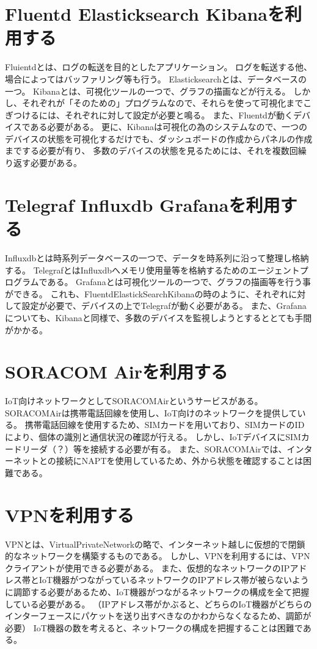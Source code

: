 \section{Fluentd Elasticksearch Kibanaを利用する}
Fluientdとは、ログの転送を目的としたアプリケーション。
ログを転送する他、場合によってはバッファリング等も行う。
Elasticksearchとは、データベースの一つ。
Kibanaとは、可視化ツールの一つで、グラフの描画などが行える。
しかし、それぞれが「そのための」プログラムなので、それらを使って可視化までこぎつけるには、それぞれに対して設定が必要と鳴る。
また、Fluentdが動くデバイスである必要がある。
更に、Kibanaは可視化の為のシステムなので、一つのデバイスの状態を可視化するだけでも、ダッシュボードの作成からパネルの作成までする必要が有り、
多数のデバイスの状態を見るためには、それを複数回繰り返す必要がある。

\section{Telegraf Influxdb Grafanaを利用する}
Influxdbとは時系列データベースの一つで、データを時系列に沿って整理し格納する。
TelegrafとはInfluxdbへメモリ使用量等を格納するためのエージェントプログラムである。
Grafanaとは可視化ツールの一つで、グラフの描画等を行う事ができる。
これも、FluentdElastickSearchKibanaの時のように、それぞれに対して設定が必要で、デバイスの上でTelegrafが動く必要がある。
また、Grafanaについても、Kibanaと同様で、多数のデバイスを監視しようとするととても手間がかかる。

\section{SORACOM Airを利用する}
IoT向けネットワークとしてSORACOMAirというサービスがある。
SORACOMAirは携帯電話回線を使用し、IoT向けのネットワークを提供している。
携帯電話回線を使用するため、SIMカードを用いており、SIMカードのIDにより、個体の識別と通信状況の確認が行える。
しかし、IoTデバイスにSIMカードリーダ（？）等を接続する必要が有る。
また、SORACOMAirでは、インターネットとの接続にNAPTを使用しているため、外から状態を確認することは困難である。

\section{VPNを利用する}
VPNとは、VirtualPrivateNetworkの略で、インターネット越しに仮想的で閉鎖的なネットワークを構築するものである。
しかし、VPNを利用するには、VPNクライアントが使用できる必要がある。
また、仮想的なネットワークのIPアドレス帯とIoT機器がつながっているネットワークのIPアドレス帯が被らないように調節する必要があるため、IoT機器がつながるネットワークの構成を全て把握している必要がある。
（IPアドレス帯がかぶると、どちらのIoT機器がどちらのインターフェースにパケットを送り出すべきなのかわからなくなるため、調節が必要）
IoT機器の数を考えると、ネットワークの構成を把握することは困難である。



